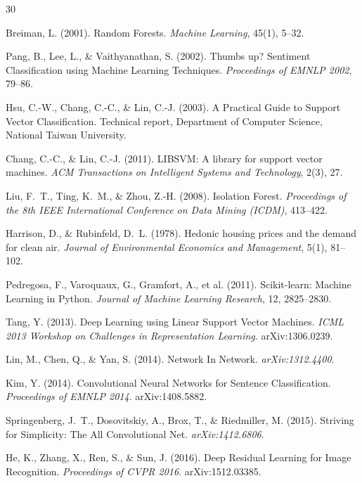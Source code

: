 \documentclass[11pt]{article}
\begin{document}

\begin{thebibliography}{30}

Breiman, L. (2001).
Random Forests.
\textit{Machine Learning}, 45(1), 5--32.

Pang, B., Lee, L., \& Vaithyanathan, S. (2002).
Thumbs up? Sentiment Classification using Machine Learning Techniques.
\textit{Proceedings of EMNLP 2002}, 79--86.

Hsu, C.-W., Chang, C.-C., \& Lin, C.-J. (2003).
A Practical Guide to Support Vector Classification. Technical report, Department of Computer
Science, National Taiwan University.

Chang, C.-C., \& Lin, C.-J. (2011).
LIBSVM: A library for support vector machines.
\textit{ACM Transactions on Intelligent Systems and Technology}, 2(3), 27.

Liu, F.~T., Ting, K.~M., \& Zhou, Z.-H. (2008).
Isolation Forest.
\textit{Proceedings of the 8th IEEE International Conference on Data Mining (ICDM)}, 413--422.

Harrison, D., \& Rubinfeld, D.~L. (1978).
Hedonic housing prices and the demand for clean air.
\textit{Journal of Environmental Economics and Management}, 5(1), 81--102.

Pedregosa, F., Varoquaux, G., Gramfort, A., et al. (2011).
Scikit-learn: Machine Learning in Python.
\textit{Journal of Machine Learning Research}, 12, 2825--2830.

Tang, Y. (2013).
Deep Learning using Linear Support Vector Machines.
\textit{ICML 2013 Workshop on Challenges in Representation Learning}. arXiv:1306.0239.

Lin, M., Chen, Q., \& Yan, S. (2014).
Network In Network. \textit{arXiv:1312.4400}.

Kim, Y. (2014).
Convolutional Neural Networks for Sentence Classification.
\textit{Proceedings of EMNLP 2014}. arXiv:1408.5882.

Springenberg, J.~T., Dosovitskiy, A., Brox, T., \& Riedmiller, M. (2015).
Striving for Simplicity: The All Convolutional Net. \textit{arXiv:1412.6806}.

He, K., Zhang, X., Ren, S., \& Sun, J. (2016).
Deep Residual Learning for Image Recognition.
\textit{Proceedings of CVPR 2016}. arXiv:1512.03385.


\end{thebibliography}
\end{document}
